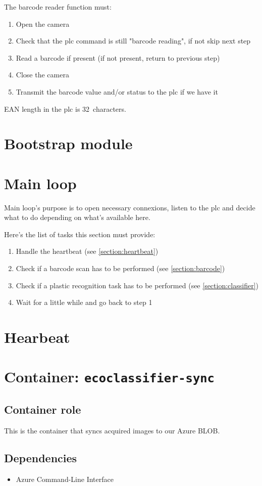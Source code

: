 The barcode reader function must:

\begin{enumerate}
    \item Open the camera
    \item Check that the \gls{plc} command is still "barcode reading", if not skip next step
    \item Read a barcode if present (if not present, return to previous step)
    \item Close the camera
    \item Transmit the barcode value and/or status to the \gls{plc} if we have it
\end{enumerate}



EAN length in the \gls{plc} is 32~characters.

\section{Bootstrap module}


\section{Main loop}

Main loop's purpose is to open necessary connexions, listen to the \gls{plc} and decide what to do depending on what's available here.

Here's the list of tasks this section must provide:

\begin{enumerate}
    \item Handle the \gls{heartbeat} (see \ref{section:heartbeat})
    \item Check if a barcode scan has to be performed (see \ref{section:barcode})
    \item Check if a plastic recognition task has to be performed (see \ref{section:classifier})
    \item Wait for a little while and go back to step 1
\end{enumerate}

\section{Hearbeat}


\section{Container: \texttt{ecoclassifier-sync}}

\subsection{Container role}

This is the container that syncs acquired images to our Azure BLOB.

\subsection{Dependencies}

\begin{itemize}
    \item Azure Command-Line Interface
\end{itemize}
